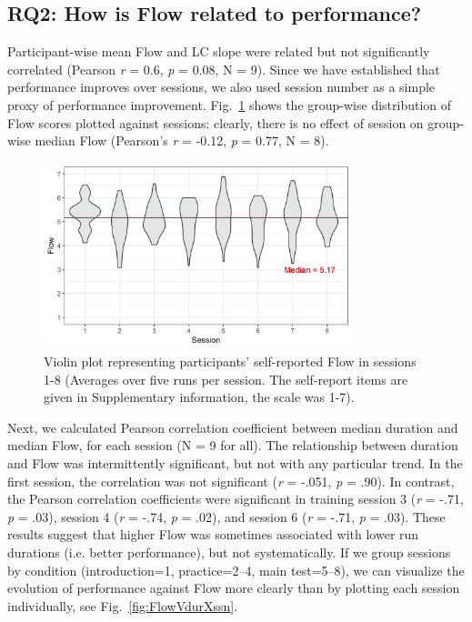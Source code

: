 \documentclass[fleqn,10pt]{wlscirep}
\newcommand{\nicewidth}{0.8\textwidth}
\begin{document}
\subsection*{RQ2: How is Flow related to performance?}

Participant-wise mean Flow and LC slope were related but not significantly correlated (Pearson {\it r} = 0.6, {\it p} = 0.08, N = 9). Since we have established that performance improves over sessions, we also used session number as a simple proxy of performance improvement. Fig.~\ref{fig:FlowVssn} shows the group-wise distribution of Flow scores plotted against sessions: clearly, there is no effect of session on group-wise median Flow (Pearson's {\it r} = -0.12, {\it p} = 0.77, N = 8).

\begin{figure}[!ht]
	\centering
	\includegraphics[width=\nicewidth]{session_fss2}
	\caption{Violin plot representing participants' self-reported Flow in sessions 1-8 (Averages over five runs per session. The self-report items are given in Supplementary information, the scale was 1-7).}
	\label{fig:FlowVssn}
\end{figure}

Next, we calculated Pearson correlation coefficient between median duration and median Flow, for each session (N = 9 for all). The relationship between duration and Flow was intermittently significant, but not with any particular trend. In the first session, the correlation was not significant ({\it r} = -.051, {\it p} = .90). In contrast, the Pearson correlation coefficients were significant in training session 3 ({\it r} = -.71, {\it p} = .03), session 4 ({\it r} = -.74, {\it p} = .02), and session 6 ({\it r} = -.71, {\it p} = .03). These results suggest that higher Flow was sometimes associated with lower run durations (i.e. better performance), but not systematically. If we group sessions by condition (introduction=1, practice=2--4, main test=5--8), we can visualize the evolution of performance against Flow more clearly than by plotting each session individually, see Fig.~\ref{fig:FlowVdurXssn}.
\end{document}

